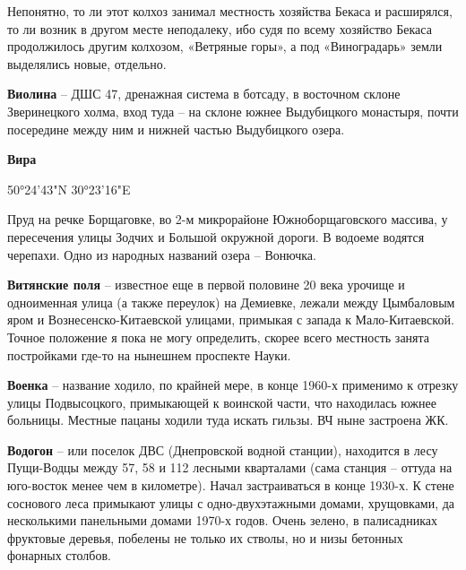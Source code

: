 Непонятно, то ли этот колхоз занимал местность хозяйства Бекаса и расширялся, то ли возник в другом месте неподалеку, ибо судя по всему хозяйство Бекаса продолжилось другим колхозом, «Ветряные горы», а под «Виноградарь» земли выделялись новые, отдельно.\\ 

\medskip

\textbf{Виолина} – ДШС 47, дренажная система в ботсаду, в восточном склоне Зверинецкого холма, вход туда – на склоне южнее Выдубицкого монастыря, почти посередине между ним и нижней частью Выдубицкого озера.\\

\medskip

\textbf{Вира} 

50°24'43"N 30°23'16"E

Пруд на речке Борщаговке, во 2-м микрорайоне Южноборщаговского массива, у пересечения улицы Зодчих и Большой окружной дороги. В водоеме водятся черепахи. Одно из народных названий озера – Вонючка.\\

\medskip

\textbf{Витянские поля} – известное еще в первой половине 20 века урочище и одноименная улица (а также переулок) на Демиевке, лежали между Цымбаловым яром и Вознесенско-Китаевской улицами, примыкая с запада к Ма\-ло-Китаевской. Точное положение я пока не могу определить, скорее всего местность занята постройками где-то на нынешнем проспекте Науки.\\

\medskip

\textbf{Военка} – название ходило, по крайней мере, в конце 1960-х применимо к отрезку улицы Подвысоцкого, примыкающей к воинской части, что находилась южнее больницы. Местные пацаны ходили туда искать гильзы. ВЧ ныне застроена ЖК.\\ 

\medskip

\textbf{Водогон} – или поселок ДВС (Днепровской водной станции), находится в лесу Пущи-Вод\-цы между 57, 58 и 112 лесными кварталами (сама станция – оттуда на юго-восток менее чем в километре). Начал застраиваться в конце 1930-х. К стене соснового леса примыкают улицы с одно-двухэтажными домами, хрущовками, да несколькими панельными домами 1970-х годов. Очень зелено, в палисадниках фруктовые деревья, побелены не только их стволы, но и низы бетонных фонарных столбов.\\

\medskip

